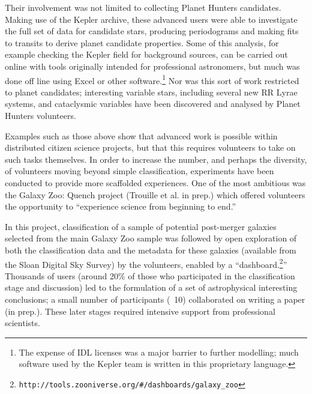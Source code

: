 \documentclass{ar2e}
\def\CaseStudy#1{\noindent{\it\bf #1 \,\,\,\,}}
\def\url#1{\texttt{#1}}
\begin{document}
Their involvement was not limited to collecting Planet Hunters candidates.
Making use of the Kepler archive, these advanced users were able to investigate
the full set of data for candidate stars, producing periodograms and making
fits  to transits to derive planet candidate properties. Some of this analysis,
for example checking the Kepler field for  background sources, can be carried
out online with tools originally intended for professional astronomers, but much
was done off line using Excel or other software.\footnote{The expense of IDL
licenses was a major barrier to further modelling; much  software used by the
Kepler team is written in this proprietary language.} Nor was this sort of work
restricted to planet candidates; interesting variable stars, including several
new RR Lyrae systems, and cataclysmic variables \citep[e.g.\ ][]{KatoOsaki} 
have been discovered and analysed by Planet Hunters volunteers. 




\CaseStudy{Galaxy Zoo: Quench.} 
Examples such as those above show that advanced work is possible within
distributed citizen science projects, but that this requires volunteers to take
on such tasks themselves. In order to increase the number, and perhaps the
diversity, of volunteers moving beyond simple classification, experiments have
been conducted to provide more scaffolded experiences. One of the most ambitious
was the Galaxy Zoo: Quench project (Trouille et al. in prep.) which offered
volunteers the opportunity to ``experience science from beginning to end.''

In this project, classification of a sample of potential post-merger galaxies
selected from the main Galaxy Zoo sample was followed by open exploration of
both the classification data and the metadata for these galaxies (available from
the Sloan Digital Sky Survey) by the volunteers, enabled by a
``dashboard.\footnote{\url{http://tools.zooniverse.org/\#/dashboards/galaxy\_zoo}}''
Thousands of users (around 20\% of those who participated in the classification
stage and discussion) led to the formulation of a set of astrophysical
interesting conclusions; a small number of participants (~10) collaborated on
writing a paper (in prep.). These later stages required intensive support
from professional scientists.
\end{document}
